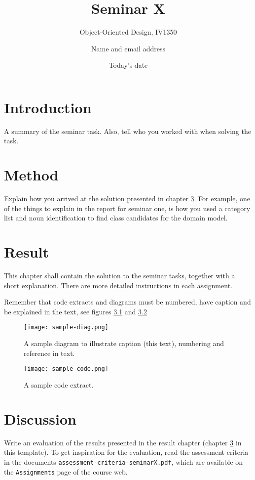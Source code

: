 \documentclass[a4paper]{scrreprt}
\title{Seminar X}
\subtitle{Object-Oriented Design, IV1350}
\author{Name and email address}
\date{Today's date}
\begin{document}
\maketitle

\tableofcontents %

\chapter{Introduction}

A summary of the seminar task. Also, tell who you worked with when solving the task. 

\chapter{Method}

Explain how you arrived at the solution presented in chapter \ref{sec:result}. For example, one of the things to explain in the report for seminar one, is how you used a category list and noun identification to find class candidates for the domain model.

\chapter{Result}
\label{sec:result}

This chapter shall contain the solution to the seminar tasks, together with a short explanation. There are more detailed instructions in each assignment.

Remember that code extracts and diagrams must be numbered, have caption and be explained in the text, see figures \ref{fig:diag} and \ref{fig:code}

\begin{figure}[h!]
  \begin{center}
    \texttt{[image: sample-diag.png]}
    \caption{A sample diagram to illustrate caption (this text), numbering and reference in text.}
    \label{fig:diag}
  \end{center}
\end{figure}

\begin{figure}[h!]
  \begin{center}
    \texttt{[image: sample-code.png]}
    \caption{A sample code extract.}
    \label{fig:code}
  \end{center}
\end{figure}

\chapter{Discussion}

Write an evaluation of the results presented in the result chapter (chapter \ref{sec:result} in this template). To get inspiration for the evaluation, read the assessment criteria in the documents \texttt{assessment-criteria-seminarX.pdf}, which are available on the \texttt{Assignments} page of the course web.
\end{document}
